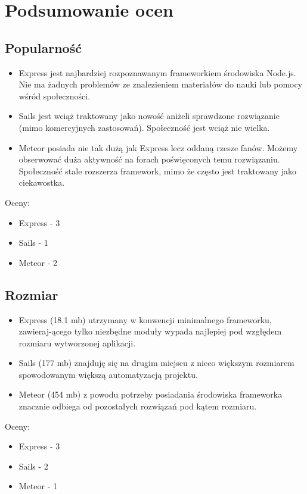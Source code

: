 \documentclass[12pt]{report}
\begin{document}
  \section{Podsumowanie ocen}
    \subsection{Popularność}
      \begin{itemize}
        \item Express jest najbardziej rozpoznawanym frameworkiem środowiska Node.js. Nie ma żadnych problemów ze znalezieniem materiałów do nauki lub pomocy wśród społeczności.
        \item Sails jest wciąż traktowany jako nowość aniżeli sprawdzone rozwiązanie (mimo komercyjnych zastosowań). Społeczność jest wciąż nie wielka.
        \item Meteor posiada nie tak dużą jak Express lecz oddaną rzesze fanów. Możemy obserwować duża aktywność na forach poświęconych temu rozwiązaniu. Społeczność stale rozszerza framework, mimo że często jest traktowany jako ciekawostka. 
      \end{itemize}
      Oceny:
      \begin{itemize}
        \item Express - 3
        \item Sails - 1
        \item Meteor - 2
      \end{itemize}

    \pagebreak
    \subsection{Rozmiar}
      \begin{itemize}
        \item Express (18.1 mb) utrzymany w konwencji minimalnego frameworku, zawieraj-ącego tylko niezbędne moduły wypada najlepiej pod wzgłędem rozmiaru wytworzonej aplikacji.
        \item Sails (177 mb) znajduję się na drugim miejscu z nieco większym rozmiarem spowodowanym większą automatyzacją projektu.
        \item Meteor (454 mb) z powodu potrzeby posiadania środowiska frameworka znacznie odbiega od pozostałych rozwiązań pod kątem rozmiaru.
      \end{itemize}
      Oceny:
      \begin{itemize}
        \item Express - 3
        \item Sails - 2
        \item Meteor - 1
      \end{itemize}
      
\end{document}
